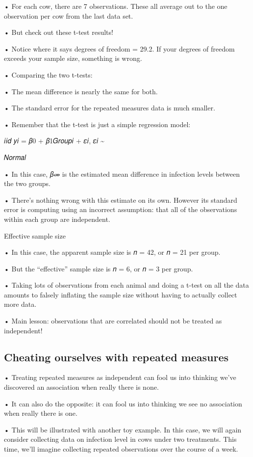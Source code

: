 \documentclass[
  letterpaper,
  DIV=11,
  numbers=noendperiod]{scrreprt}
\begin{document}
• For each cow, there are 7 observations. These all average out to the
one observation per cow from the last data set.

• But check out these t-test results!

• Notice where it says degrees of freedom = 29.2. If your degrees of
freedom exceeds your sample size, something is wrong.

• Comparing the two t-tests:

• The mean difference is nearly the same for both.

• The standard error for the repeated measures data is much smaller.

• Remember that the t-test is just a simple regression model:

𝑖𝑖𝑑 𝑦𝑖 = 𝛽0 + 𝛽1𝐺𝑟𝑜𝑢𝑝𝑖 + 𝜀𝑖, 𝜀𝑖 \textasciitilde{}

𝑁𝑜𝑟𝑚𝑎𝑙

• In this case, 𝛽መ is the estimated mean difference in infection levels
between the two groups.

• There's nothing wrong with this estimate on its own. However its
standard error is computing using an incorrect assumption: that all of
the observations within each group are independent.

Effective sample size

• In this case, the apparent sample size is 𝑛 = 42, or 𝑛 = 21 per group.

• But the ``effective'' sample size is 𝑛 = 6, or 𝑛 = 3 per group.

• Taking lots of observations from each animal and doing a t-test on all
the data amounts to falsely inflating the sample size without having to
actually collect more data.

• Main lesson: observations that are correlated should not be treated as
independent!

\hypertarget{cheating-ourselves-with-repeated-measures}{%
\subsection{Cheating ourselves with repeated
measures}\label{cheating-ourselves-with-repeated-measures}}

• Treating repeated measures as independent can fool us into thinking
we've discovered an association when really there is none.

• It can also do the opposite: it can fool us into thinking we see no
association when really there is one.

• This will be illustrated with another toy example. In this case, we
will again consider collecting data on infection level in cows under two
treatments. This time, we'll imagine collecting repeated observations
over the course of a week.
\end{document}
